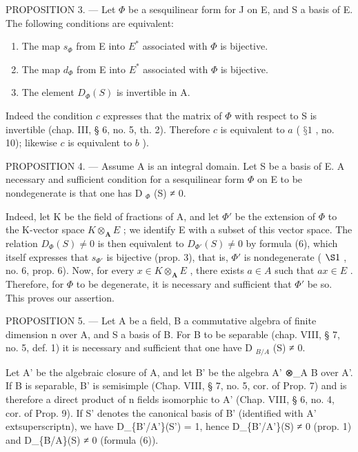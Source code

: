PROPOSITION 3. --- Let \(\Phi\) be a sesquilinear form for J on E, and S a basis of E. The following conditions are equivalent:

\begin{enumerate}
\def\labelenumi{\alph{enumi})}
\item
  The map \(s_{\Phi}\) from E into \(E^{*}\) associated with \(\Phi\) is bijective.
\item
  The map \(d_{\Phi}\) from E into \(E^{*}\) associated with \(\Phi\) is bijective.
\item
  The element \(D_{\Phi}(S)\) is invertible in A.
\end{enumerate}

Indeed the condition \(c\) expresses that the matrix of \(\Phi\) with respect to S is invertible (chap. III, § 6, no. 5, th. 2). Therefore \(c\) is equivalent to \(a\) ( \(§ 1\) , no. 10); likewise \(c\) is equivalent to \(b\) ).

PROPOSITION 4. --- Assume A is an integral domain. Let S be a basis of E. A necessary and sufficient condition for a sesquilinear form \(\Phi\) on E to be nondegenerate is that one has D \(_{\Phi}\) (S) ≠ 0.

Indeed, let K be the field of fractions of A, and let \(\Phi'\) be the extension of \(\Phi\) to the K-vector space \(K\otimes_{\mathbf{A}}E\) ; we identify E with a subset of this vector space. The relation \(D_{\Phi}(S)\neq0\) is then equivalent to \(D_{\Phi'}(S)\neq0\) by formula (6), which itself expresses that \(s_{\Phi'}\) is bijective (prop. 3), that is, \(\Phi'\) is nondegenerate ( \(\S1\) , no. 6, prop. 6). Now, for every \(x\in K\otimes_{\mathbf{A}}E\) , there exists \(a\in A\) such that \(ax\in E\) . Therefore, for \(\Phi\) to be degenerate, it is necessary and sufficient that \(\Phi'\) be so. This proves our assertion.

PROPOSITION 5. --- Let A be a field, B a commutative algebra of finite dimension n over A, and S a basis of B. For B to be separable (chap. VIII, § 7, no. 5, def. 1) it is necessary and sufficient that one have D \(_{B/A}\) (S) ≠ 0.

Let A' be the algebraic closure of A, and let B' be the algebra A' ⊗\_A B over A'. If B is separable, B' is semisimple (Chap. VIII, § 7, no. 5, cor. of Prop. 7) and is therefore a direct product of n fields isomorphic to A' (Chap. VIII, § 6, no. 4, cor. of Prop. 9). If S' denotes the canonical basis of B' (identified with A'	extsuperscript{n}), we have D\_\{B'/A'\}(S') = 1, hence D\_\{B'/A'\}(S) ≠ 0 (prop. 1) and D\_\{B/A\}(S) ≠ 0 (formula (6)).


